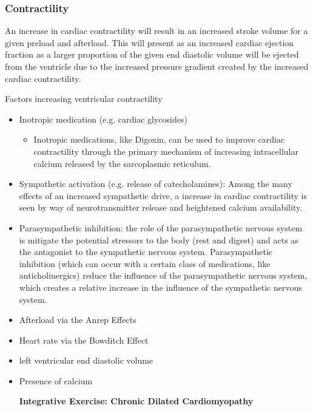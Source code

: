 {\subsubsection{Contractility}

An increase in cardiac contractility will result in an increased stroke volume for a given preload and afterload. This will present as an increased cardiac ejection fraction as a larger proportion of the given end diastolic volume will be ejected from the ventricle due to the increased pressure gradient created by the increased cardiac contractility. 

Factors increasing ventricular contractility 
\begin{itemize}
    \item Inotropic medication (e.g. cardiac glycosides) 
    \begin{itemize}
        \item Inotropic medications, like Digoxin, can be used to improve cardiac contractility through the primary mechanism of increasing intracellular calcium released by the sarcoplasmic reticulum. 
    \end{itemize}
    \item Sympathetic activation (e.g. release of catecholamines): Among the many effects of an increased sympathetic drive, a increase in cardiac contractility is seen by way of neurotransmitter release and heightened calcium availability.
    \item Parasympathetic inhibition: the role of the parasympathetic nervous system is mitigate the potential stressors to the body (rest and digest) and acts as the antagonist to the sympathetic nervous system. Parasympathetic inhibition (which can occur with a certain class of medications, like anticholinergics) reduce the influence of the parasympathetic nervous system, which creates a relative increase in the influence of the sympathetic nervous system. 
    \begin{itemize}
    \end{itemize}
    \item Afterload via the Anrep Effects
    \item Heart rate via the Bowditch Effect
    \item left ventricular end diastolic volume
    \item Presence of calcium 



\textbf{Integrative Exercise: Chronic Dilated Cardiomyopathy }


\end{itemize}}
